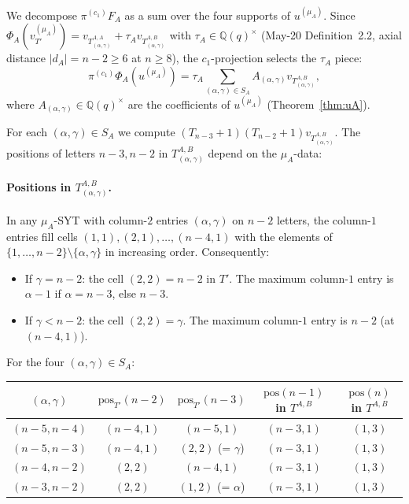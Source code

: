 \documentclass[11pt]{article}
\theoremstyle{definition}
\begin{document}
We decompose $\pi^{(c_1)} F_A$ as a sum over the four supports of
$u^{(\mu_A)}$. Since $\Phi_A(v_{T'}^{(\mu_A)}) =
v_{T^{A,A}_{(\alpha,\gamma)}} + \tau_A v_{T^{A,B}_{(\alpha,\gamma)}}$
with $\tau_A \in \mathbb{Q}(q)^\times$ (May-20 Definition~2.2, axial
distance $|d_A| = n-2 \ge 6$ at $n \ge 8$), the $c_1$-projection
selects the $\tau_A$ piece:
\[
   \pi^{(c_1)} \Phi_A(u^{(\mu_A)})
   = \tau_A \sum_{(\alpha, \gamma) \in S_A}
       A_{(\alpha, \gamma)} v_{T^{A,B}_{(\alpha, \gamma)}},
\]
where $A_{(\alpha, \gamma)} \in \mathbb{Q}(q)^\times$ are the
coefficients of $u^{(\mu_A)}$ (Theorem~\ref{thm:uA}).

For each $(\alpha, \gamma) \in S_A$ we compute
$(T_{n-3}{+}1)(T_{n-2}{+}1) v_{T^{A,B}_{(\alpha, \gamma)}}$.
The positions of letters $n-3, n-2$ in
$T^{A,B}_{(\alpha, \gamma)}$ depend on the $\mu_A$-data:

\paragraph{Positions in $T^{A,B}_{(\alpha, \gamma)}$.}  In any
$\mu_A$-SYT with column-$2$ entries $(\alpha, \gamma)$ on $n-2$
letters, the column-$1$ entries fill cells $(1,1), (2,1), \ldots,
(n-4,1)$ with the elements of $\{1, \ldots, n-2\} \setminus
\{\alpha, \gamma\}$ in increasing order. Consequently:
\begin{itemize}[leftmargin=2em,topsep=0.3em,itemsep=0.2em]
\item If $\gamma = n-2$: the cell $(2, 2) = n-2$ in $T'$. The
maximum column-$1$ entry is $\alpha-1$ if $\alpha = n-3$, else
$n-3$.
\item If $\gamma < n-2$: the cell $(2, 2) = \gamma$. The
maximum column-$1$ entry is $n-2$ (at $(n-4, 1)$).
\end{itemize}
For the four $(\alpha, \gamma) \in S_A$:
\begin{center}
\begin{tabular}{ccccc}
\toprule
$(\alpha, \gamma)$ & $\mathrm{pos}_{T'}(n-2)$ & $\mathrm{pos}_{T'}(n-3)$ & $\mathrm{pos}(n-1)$ in $T^{A,B}$ & $\mathrm{pos}(n)$ in $T^{A,B}$ \\
\midrule
$(n{-}5, n{-}4)$ & $(n{-}4,1)$ & $(n{-}5,1)$ & $(n{-}3, 1)$ & $(1, 3)$ \\
$(n{-}5, n{-}3)$ & $(n{-}4,1)$ & $(2, 2)$ (= $\gamma$) & $(n{-}3, 1)$ & $(1, 3)$ \\
$(n{-}4, n{-}2)$ & $(2, 2)$    & $(n{-}4, 1)$ & $(n{-}3, 1)$ & $(1, 3)$ \\
$(n{-}3, n{-}2)$ & $(2, 2)$    & $(1, 2)$ (= $\alpha$) & $(n{-}3, 1)$ & $(1, 3)$ \\
\bottomrule
\end{tabular}
\end{center}
\end{document}
